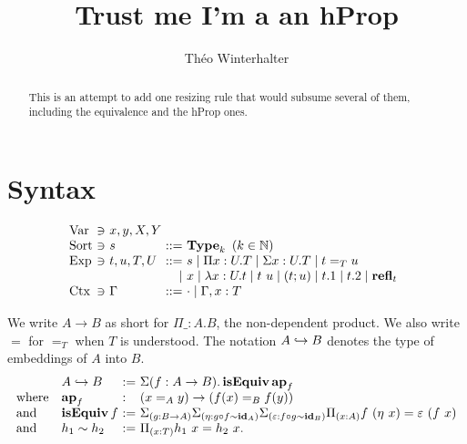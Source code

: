 \documentclass[a4paper,english]{lipics-utf8x}
\title{Trust me I'm a an hProp}
\author[1]{Théo Winterhalter}
\begin{document}
  \maketitle

  \begin{abstract}
    This is an attempt to add one resizing rule that would subsume several of
    them, including the equivalence and the hProp ones.
  \end{abstract}

  \section{Syntax}

  \[
    \begin{array}{l@{~}l@{~}l@{~}r@{~}l@{\quad}l}
      \Var  & \ni & x,y,X,Y \\
      \Sort & \ni & s             & ::= & \Type_k \mbox{ }
                                                (k \in \mathbb{N}) \\
      \Exp  & \ni & t,u,T,U & ::= & s \mid \Pi x:U.T \mid \Sigma x:U.T \mid
                                    t =_T u \\ %
                         &&& \mid & x \mid \lambda x:U.t \mid t~u
                               \mid (t;u) \mid t.1 \mid t.2 \mid \refl_t \\
      \Ctx  & \ni & \Gamma  & ::= & \cdot \mid \Gamma, x:T \\
    \end{array}
  \]

  \noindent %
  We write $A \to B$ as short for $\Pi \_:A.B$, the non-dependent product.
  We also write $=$ for $=_T$ when $T$ is understood.
  The notation $A \hookrightarrow B$ denotes the type of embeddings of $A$ into $B$.
  \[
    \begin{array}{l@{\quad}l@{~}l@{~}l}
      & \emb{A}{B} &:=& \Sigma (f : A \to B). \isEquiv \ap_f \\
      \text{where} & \ap_f &:& (x =_A y) \to (f(x) =_B f(y)) \\
      \text{and} & \isEquiv f &:=& \Sigma_{(g : B \to A)}
                               \Sigma_{(\eta : g \circ f \sim \id_A)}
                               \Sigma_{(\varepsilon : f \circ g \sim \id_B)}
                               \Pi_{(x : A)} f~(\eta~x) = \varepsilon~(f~x) \\
      \text{and} & h_1 \sim h_2 &:=& \Pi_{(x : T)} h_1~x = h_2~x.
    \end{array}
  \]
\end{document}
